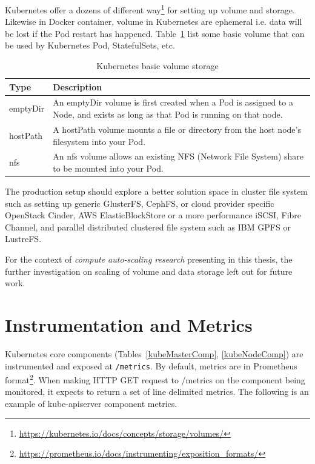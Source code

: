 Kubernetes offer a dozens of different way\footnote{\url{https://kubernetes.io/docs/concepts/storage/volumes/}} for setting up volume and storage. Likewise in Docker container, volume in Kubernetes are ephemeral i.e. data will be lost if the Pod restart has happened. Table~\ref{kubeVol} list some basic volume that can be used by Kubernetes Pod, StatefulSets, etc.

\begin{table}[H]
\centering
    \begin{tabular}{ | l | p{11cm} |}
    \hline
    Type & Description \\ \hline
    emptyDir & An emptyDir volume is first created when a Pod is assigned to a Node, and exists as long as that Pod is running on that node. \\ \hline
    hostPath & A hostPath volume mounts a file or directory from the host node’s filesystem into your Pod. \\  \hline
    nfs & An nfs volume allows an existing NFS (Network File System) share to be mounted into your Pod. \\
    \hline
    \end{tabular}
\caption{Kubernetes basic volume storage}
\label{kubeVol}  
\end{table}

\noindent The production setup should explore a better solution space in cluster file system such as setting up generic GlusterFS, CephFS, or cloud provider specific OpenStack Cinder, AWS ElasticBlockStore or a more performance iSCSI, Fibre Channel, and parallel distributed clustered file system such as IBM GPFS or LustreFS.

For the context of \emph{compute auto-scaling research} presenting in this thesis, the further investigation on scaling of volume and data storage left out for future work.

\section{Instrumentation and Metrics}
\label{metrics}
Kubernetes core components (Tables~\ref{kubeMasterComp}, \ref{kubeNodeComp}) are instrumented and exposed at \verb|/metrics|. By default, metrics are in Prometheus format\footnote{\url{https://prometheus.io/docs/instrumenting/exposition_formats/}}. When making HTTP GET request to /metrics on the component being monitored, it expects to return a set of line delimited metrics. The following is an example of kube-apiserver component metrics.

